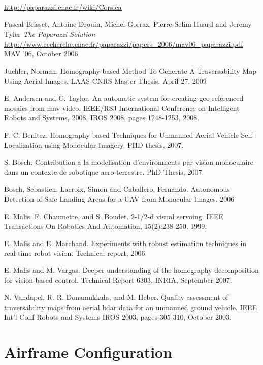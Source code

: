 \documentclass[a4paper,11pt]{report}
\begin{document}
\begin{thebibliography}{9}
  \url{http://paparazzi.enac.fr/wiki/Corsica}

  Pascal Brisset, Antoine Drouin, Michel Gorraz, Pierre-Selim Huard and Jeremy Tyler
  \emph{The Paparazzi Solution}
  \url{http://www.recherche.enac.fr/paparazzi/papers_2006/mav06_paparazzi.pdf}
  MAV '06,
  October 2006

Juchler, Norman, Homography-based Method To Generate A Traversability Map Using Aerial Images, LAAS-CNRS Master Thesis, April 27, 2009

E. Andersen and C. Taylor. An automatic system for creating geo-referenced mosaics from mav video.  IEEE/RSJ International Conference on Intelligent Robots and Systems, 2008. IROS 2008, pages 1248-1253, 2008.

F. C. Benitez. Homography based Techniques for Unmanned Aerial Vehicle Self-Localization using Monocular Imagery. PHD thesis, 2007.

S. Bosch. Contribution a la modelisation d'environments par vision monoculaire dans un contexte de robotique aero-terrestre. PhD Thesis, 2007.

Bosch, Sebastien, Lacroix, Simon and Caballero, Fernando. Autonomous Detection of Safe Landing Areas for a UAV from Monocular Images. 2006

E. Malis, F. Chaumette, and S. Boudet. 2-1/2-d visual servoing. IEEE Transactions On Robotics And Automation, 15(2):238-250, 1999.

E. Malis and E. Marchand. Experiments with robust estimation techniques in real-time robot vision. Technical report, 2006.

E. Malis and M. Vargas. Deeper understanding of the homography decomposition for vision-based control. Technical Report 6303, INRIA, September 2007.

N. Vandapel, R. R. Donamukkala, and M. Heber. Quality assessment of traversability maps from aerial lidar data for an unmanned ground vehicle. IEEE Int'l Conf Robots and Systems IROS 2003, pages 305-310, October 2003.

\end{thebibliography}

\appendix
\appendixpage
\addappheadtotoc

\chapter{Airframe Configuration}

\end{document}
